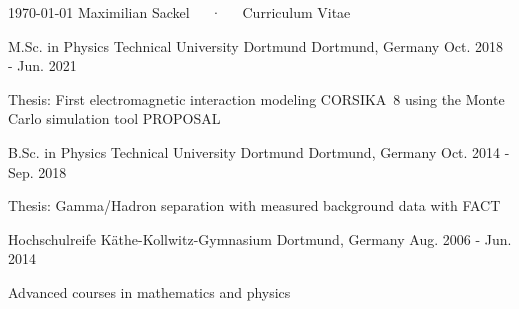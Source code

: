 \documentclass[11pt, a4paper]{Awesome-CV/awesome-cv}
\begin{document}
\makecvheader

\makecvfooter
{\today}
{Maximilian Sackel~~~·~~~Curriculum Vitae}
{\thepage}




\begin{cventries}
    \cventry
    {M.Sc. in Physics} %
    {Technical University Dortmund} %
    {Dortmund, Germany} %
    {Oct. 2018 - Jun. 2021} %
    {
        \begin{cvitems} %
        \item {Thesis: First electromagnetic interaction modeling CORSIKA~8 using the Monte Carlo simulation tool PROPOSAL}
        \end{cvitems}
    }%

    \cventry
    {B.Sc. in Physics} %
    {Technical University Dortmund} %
    {Dortmund, Germany} %
    {Oct. 2014 - Sep. 2018} %
    {
        \begin{cvitems} %
        \item {Thesis: Gamma/Hadron separation with measured background data with FACT}
        \end{cvitems}
    }%

    \cventry
    {Hochschulreife} %
    {Käthe-Kollwitz-Gymnasium} %
    {Dortmund, Germany} %
    {Aug. 2006 - Jun. 2014} %
    {
        \begin{cvitems} %
        \item {Advanced courses in mathematics and physics}
        \end{cvitems}
    }%
\end{cventries}
\end{document}
